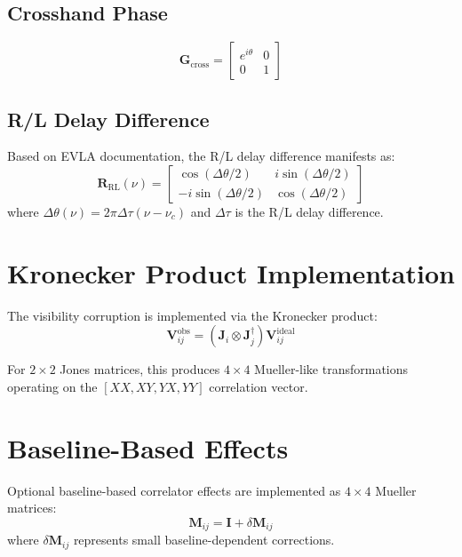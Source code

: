 \documentclass{aastex631}
\begin{document}
\subsection{Crosshand Phase}
\begin{equation}
\mathbf{G}_{\mathrm{cross}} = \begin{bmatrix} e^{i\theta} & 0 \\ 0 & 1 \end{bmatrix}
\end{equation}

\subsection{R/L Delay Difference}
Based on EVLA documentation, the R/L delay difference manifests as:
\begin{equation}
\mathbf{R}_{\mathrm{RL}}(\nu) = \begin{bmatrix} 
\cos(\Delta\theta/2) & i\sin(\Delta\theta/2) \\ 
-i\sin(\Delta\theta/2) & \cos(\Delta\theta/2) 
\end{bmatrix}
\end{equation}
where $\Delta\theta(\nu) = 2\pi \Delta\tau (\nu - \nu_c)$ and $\Delta\tau$ is the R/L delay difference.

\section{Kronecker Product Implementation}

The visibility corruption is implemented via the Kronecker product:
\begin{equation}
\mathbf{V}_{ij}^{\mathrm{obs}} = (\mathbf{J}_i \otimes \mathbf{J}_j^{\dagger}) \mathbf{V}_{ij}^{\mathrm{ideal}}
\end{equation}

For $2 \times 2$ Jones matrices, this produces $4 \times 4$ Mueller-like transformations operating on the $[XX, XY, YX, YY]$ correlation vector.

\section{Baseline-Based Effects}

Optional baseline-based correlator effects are implemented as $4 \times 4$ Mueller matrices:
\begin{equation}
\mathbf{M}_{ij} = \mathbf{I} + \delta\mathbf{M}_{ij}
\end{equation}
where $\delta\mathbf{M}_{ij}$ represents small baseline-dependent corrections.
\end{document}
